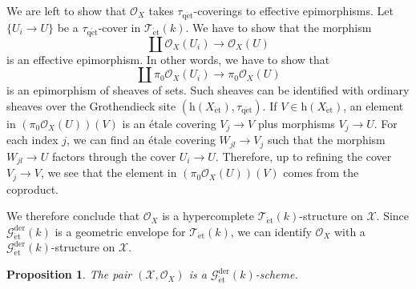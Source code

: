 \documentclass[12pt,a4paper,reqno]{amsart}
\theoremstyle{plain}
\newtheorem{prop}[thm]{Proposition}
\theoremstyle{definition}
\theoremstyle{remark}
\numberwithin{equation}{section}
\begin{document}
We are left to show that ${\mathcal O}_X$ takes ${\tau_\mathrm{q\acute{e}t}}$-coverings to effective epimorphisms.
Let $\{U_i \to U\}$ be a ${\tau_\mathrm{q\acute{e}t}}$-cover in ${{\mathcal T}_{\mathrm{\acute{e}t}}(k)}$.
We have to show that the morphism
\[ \coprod {\mathcal O}_X(U_i) \to {\mathcal O}_X(U) \]
is an effective epimorphism. In other words, we have to show that
\[ \coprod \pi_0 {\mathcal O}_X(U_i) \to \pi_0 {\mathcal O}_X(U) \]
is an epimorphism of sheaves of sets.
Such sheaves can be identified with ordinary sheaves over the Grothendieck site $(\mathrm h(X_{\mathrm{\acute{e}t}}), {\tau_\mathrm{q\acute{e}t}})$.
{\ignorespaces}
If $V \in \mathrm h(X_{\mathrm{\acute{e}t}})$, an element in $(\pi_0 {\mathcal O}_X(U))(V)$ is an \'etale covering $V_j \to V$ plus morphisms $V_j \to U$.
For each index $j$, we can find an \'etale covering $W_{jl} \to V_j$ such that the morphism $W_{jl} \to U$ factors through the cover $U_i \to U$.
Therefore, up to refining the cover $V_j \to V$, we see that the element in $(\pi_0 {\mathcal O}_X(U))(V)$ comes from the coproduct.

We therefore conclude that ${\mathcal O}_X$ is a hypercomplete ${{\mathcal T}_{\mathrm{\acute{e}t}}(k)}$-structure on ${\mathcal X}$.
Since ${{\mathcal G}_{\mathrm{\acute{e}t}}^\mathrm{der}(k)}$ is a geometric envelope for ${{\mathcal T}_{\mathrm{\acute{e}t}}(k)}$, we can identify ${\mathcal O}_X$ with a ${{\mathcal G}_{\mathrm{\acute{e}t}}^\mathrm{der}(k)}$-structure on ${\mathcal X}$.

\begin{prop} \label{prop:Get_scheme}
	The pair $({\mathcal X}, {\mathcal O}_X)$ is a ${{\mathcal G}_{\mathrm{\acute{e}t}}^\mathrm{der}(k)}$-scheme.
\end{prop}
\end{document}
